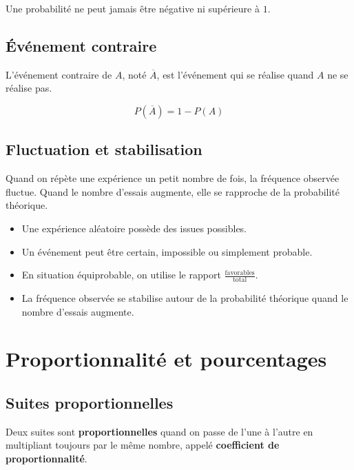 \documentclass[11pt,a4paper,twoside]{book}
\begin{document}
\begin{attentionbox}
Une probabilité ne peut jamais être négative ni supérieure à \(1\).
\end{attentionbox}

\section{Événement contraire}
\begin{definitionbox}
L'événement contraire de \(A\), noté \(\overline{A}\), est l'événement qui se réalise
quand \(A\) ne se réalise pas.
\end{definitionbox}

\begin{methodebox}
\[
P(\overline{A})=1-P(A)
\]
\end{methodebox}

\section{Fluctuation et stabilisation}
\begin{definitionbox}
Quand on répète une expérience un petit nombre de fois, la fréquence observée fluctue.
Quand le nombre d'essais augmente, elle se rapproche de la probabilité théorique.
\end{definitionbox}

\begin{retenirbox}
\begin{itemize}
\item Une expérience aléatoire possède des issues possibles.
\item Un événement peut être certain, impossible ou simplement probable.
\item En situation équiprobable, on utilise le rapport \(\frac{\text{favorables}}{\text{total}}\).
\item La fréquence observée se stabilise autour de la probabilité théorique quand le nombre d'essais augmente.
\end{itemize}
\end{retenirbox}

\chapter{Proportionnalité et pourcentages}

\section{Suites proportionnelles}
\begin{definitionbox}
Deux suites sont \textbf{proportionnelles} quand on passe de l'une à l'autre
en multipliant toujours par le même nombre, appelé \textbf{coefficient de proportionnalité}.
\end{definitionbox}
\end{document}
